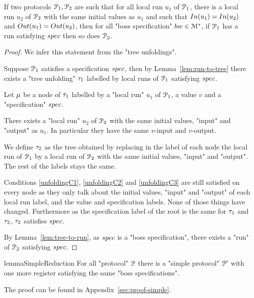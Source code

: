 \begin{lemma}
	\label{lem:local-to-global}
	If two protocols $\mathcal{P}_1, \mathcal{P}_2$ are such that for all local run $u_1$ of $\mathcal{P}_1$, there is a local run $u_2$ of $\mathcal{P}_2$ with the same initial values as $u_1$ and such that $\Input{u_1} = \Input{u_2}$ and $\Output{u_1} = \Output{u_2}$, then for all "boss specification" $bw \in \mathcal{M}^*$, if $\mathcal{P}_1$ has a run satisfying $\spec$ then so does $\mathcal{P}_2$.
\end{lemma}
\ifproofs
\begin{proof}
	We infer this statement from the "tree unfoldings".
	
	Suppose $\mathcal{P}_1$ satisfies a specification $\spec$, then by Lemma~\ref{lem:run-to-tree} there exists a "tree unfolding" $\tau_1$ labelled by local runs of $\mathcal{P}_1$ satisfying $\spec$. 
	
	Let $\mu$ be a node of $\tau_1$ labelled by a "local run" $u_1$ of $\mathcal{P}_1$, a value $v$ and a "specification" $\spec$.  
	
	There exists a "local run" $u_2$ of $\mathcal{P}_2$ with the same initial values, "input" and "output" as $u_1$. In particular they have the same $v$-input and $v$-output.
	
	We define $\tau_2$ as the tree obtained by replacing in the label of each node the local run of $\mathcal{P}_1$ by a local run of $\mathcal{P}_2$ with the same initial values, "input" and "output". The rest of the labels stays the same.
	
	Conditions \ref{unfoldingC1}, \ref{unfoldingC2} and \ref{unfoldingC3} are still satisfied on every node as they only talk about the initial values, "input" and "output" of each local run label, and the value and specification labels. None of those things have changed.
	Furthermore as the specification label of the root is the same for $\tau_1$ and $\tau_2$, $\tau_2$ satisfies $\spec$.
	
	By Lemma~\ref{lem:tree-to-run}, as $\spec$ is a "boss specification", there exists a "run" of $\mathcal{P}_2$ satisfying $\spec$.
\end{proof}
\fi


\begin{restatable}{lemma}{SimpleReduction}
	\label{lem:simple-reduction}
	For all "protocol" $\mathcal{P}$ there is a "simple protocol" $\mathcal{P}'$ with one more register satisfying the same "boss specifications".
\end{restatable}

The proof can be found in Appendix~\ref{sec:proof-simple}.

